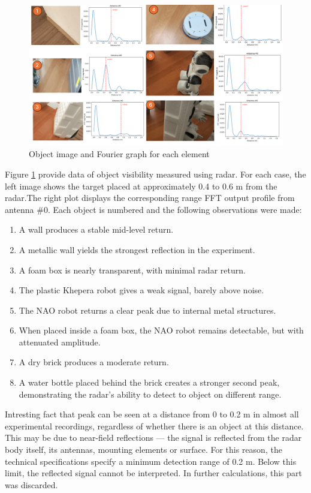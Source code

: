 \begin{figure}[H]
    \centering
    \includegraphics[width=0.85\linewidth]{Src/images/E1S1.png}
    \caption{Object image and Fourier graph for each element}
    \label{fig:Objectvis}
\end{figure}

Figure \ref{fig:Objectvis} provide data of object visibility measured using radar. For each case, the left image shows the target placed at approximately 0.4 to 0.6 m from the radar.The right plot displays the corresponding range FFT output profile from antenna \#0.
Each object is numbered and the following observations were made:
\begin{enumerate}
            \item A wall produces a stable mid-level return.
            \item A metallic wall yields the strongest reflection in the experiment.
            \item A foam box is nearly transparent, with minimal radar return.
            \item The plastic Khepera robot gives a weak signal, barely above noise.
            \item The NAO robot returns a clear peak due to internal metal structures.
            \item When placed inside a foam box, the NAO robot remains detectable, but with attenuated amplitude.
            \item A dry brick produces a moderate return.
            \item A water bottle placed behind the brick creates a stronger second peak, 
            demonstrating the radar's ability to detect to object on different range.
\end{enumerate}

Intresting fact that peak can be seen at a distance from 0 to 0.2 m in almost all experimental recordings, regardless of whether there is an object at this distance.  This may be due to near-field reflections — the signal is reflected from the radar body itself, its antennas, mounting elements or surface. For this reason, the technical specifications specify a minimum detection range of 0.2 m. Below this limit, the reflected signal cannot be interpreted. In further calculations, this part was discarded.

